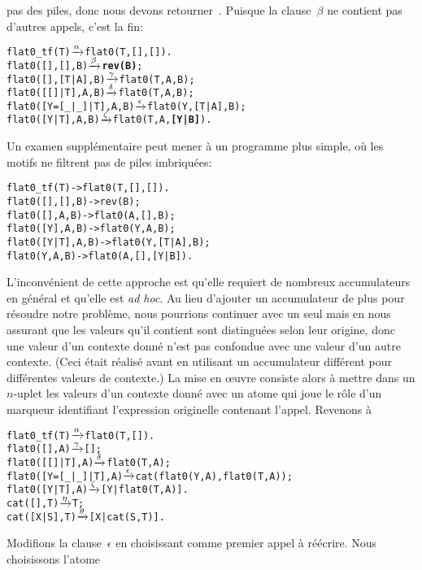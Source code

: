 pas des piles, donc nous devons retourner~. Puisque la
clause~\(\beta\) ne contient pas d'autres appels, c'est la fin:
\begin{alltt}
flat0_tf(T)                \(\smashedrightarrow{\alpha}\) flat0(T,[],[]).
flat0(         [],   [],B) \(\smashedrightarrow{\beta}\) \textbf{rev(B)};
flat0(         [],[T|A],B) \(\smashedrightarrow{\gamma}\) flat0(T,A,B);
flat0(     [[]|T],    A,B) \(\smashedrightarrow{\delta}\) flat0(T,A,B);
flat0([Y=[\_|\_]|T],    A,B) \(\smashedrightarrow{\epsilon}\) flat0(Y,[T|A],B);
flat0(      [Y|T],    A,B) \(\smashedrightarrow{\zeta}\) flat0(T,A,\textbf{[Y|B]}).
\end{alltt}
Un examen supplémentaire peut mener à un programme plus simple, où les
motifs ne filtrent pas de piles imbriquées:
\begin{alltt}
flat0_tf(T)       -> flat0(T,[],[]).
flat0(   [],[],B) -> rev(B);
flat0(   [], A,B) -> flat0(A,   [],    B);
flat0(  [Y], A,B) -> flat0(Y,    A,    B);\hfill% \emph{Optimisation}
flat0([Y|T], A,B) -> flat0(Y,[T|A],    B);
flat0(    Y, A,B) -> flat0(A,   [],[Y|B]).
\end{alltt}
L'inconvénient de cette approche est qu'elle requiert de nombreux
accumulateurs en général et qu'elle est \emph{ad hoc}. Au lieu
d'ajouter un accumulateur de plus pour résoudre notre problème, nous
pourrions continuer avec un seul mais en nous assurant que les valeurs
qu'il contient sont distinguées selon leur origine, donc une valeur
d'un contexte donné n'est pas confondue avec une valeur d'un autre
contexte. (Ceci était réalisé avant en utilisant un accumulateur
différent pour différentes valeurs de contexte.) La mise en {\oe}uvre
consiste alors à mettre dans un \(n\)-uplet les valeurs d'un contexte
donné avec un atome qui joue le rôle d'un marqueur identifiant
l'expression originelle contenant l'appel. Revenons à
\begin{alltt}
flat0\_tf(T)          \(\smashedrightarrow{\alpha}\) flat0(T,[]).
flat0(         [],A) \(\smashedrightarrow{\gamma}\) [];\hfill% A \emph{inutile pour le moment}
flat0(     [[]|T],A) \(\smashedrightarrow{\delta}\) flat0(T,A);
flat0([Y=[\_|\_]|T],A) \(\smashedrightarrow{\epsilon}\) cat(flat0(Y,A),flat0(T,A));
flat0(      [Y|T],A) \(\smashedrightarrow{\zeta}\) [Y|flat0(T,A)].
cat(   [],T)         \(\smashedrightarrow{\eta}\) T;
cat([X|S],T)         \(\smashedrightarrow{\theta}\) [X|cat(S,T)].
\end{alltt}
Modifions la clause~\(\epsilon\) en choisissant 
comme premier appel à réécrire. Nous choisissons l'atome~
